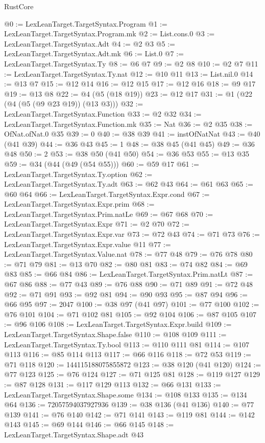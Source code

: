 \begin{lexlean}{RustCore}
\begin{coremodule}
@0 := LexLeanTarget.TargetSyntax.Program
@1 := LexLeanTarget.TargetSyntax.Program.mk
@2 := List.cons.{0}
@3 := LexLeanTarget.TargetSyntax.Adt
@4 := @2 @3
@5 := LexLeanTarget.TargetSyntax.Adt.mk
@6 := List.{0}
@7 := LexLeanTarget.TargetSyntax.Ty
@8 := @6 @7
@9 := @2 @8
@10 := @2 @7
@11 := LexLeanTarget.TargetSyntax.Ty.nat
@12 := @10 @11
@13 := List.nil.{0}
@14 := @13 @7
@15 := @12 @14
@16 := @12 @15
@17 := @12 @16
@18 := @9 @17
@19 := @13 @8
@22 := @4 (@5 (@18 @19))
@23 := @12 @17
@31 := @1 (@22 (@4 (@5 (@9 @23 @19)) (@13 @3)))
@32 := LexLeanTarget.TargetSyntax.Function
@33 := @2 @32
@34 := LexLeanTarget.TargetSyntax.Function.mk
@35 := Nat
@36 := @2 @35
@38 := OfNat.ofNat.{0} @35
@39 := 0
@40 := @38 @39
@41 := instOfNatNat
@43 := @40 (@41 @39)
@44 := @36 @43
@45 := 1
@48 := @38 @45 (@41 @45)
@49 := @36 @48
@50 := 2
@53 := @38 @50 (@41 @50)
@54 := @36 @53
@55 := @13 @35
@59 := @34 (@44 (@49 (@54 @55)))
@60 := @59 @17
@61 := LexLeanTarget.TargetSyntax.Ty.option
@62 := LexLeanTarget.TargetSyntax.Ty.adt
@63 := @62 @43
@64 := @61 @63
@65 := @60 @64
@66 := LexLeanTarget.TargetSyntax.Expr.cond
@67 := LexLeanTarget.TargetSyntax.Expr.prim
@68 := LexLeanTarget.TargetSyntax.Prim.natLe
@69 := @67 @68
@70 := LexLeanTarget.TargetSyntax.Expr
@71 := @2 @70
@72 := LexLeanTarget.TargetSyntax.Expr.var
@73 := @72 @43
@74 := @71 @73
@76 := LexLeanTarget.TargetSyntax.Expr.value @11
@77 := LexLeanTarget.TargetSyntax.Value.nat
@78 := @77 @48
@79 := @76 @78
@80 := @71 @79
@81 := @13 @70
@82 := @80 @81
@83 := @74 @82
@84 := @69 @83
@85 := @66 @84
@86 := LexLeanTarget.TargetSyntax.Prim.natLt
@87 := @67 @86
@88 := @77 @43
@89 := @76 @88
@90 := @71 @89
@91 := @72 @48
@92 := @71 @91
@93 := @92 @81
@94 := @90 @93
@95 := @87 @94
@96 := @66 @95
@97 := 2047
@100 := @38 @97 (@41 @97)
@101 := @77 @100
@102 := @76 @101
@104 := @71 @102 @81
@105 := @92 @104
@106 := @87 @105
@107 := @96 @106
@108 := LexLeanTarget.TargetSyntax.Expr.build
@109 := LexLeanTarget.TargetSyntax.Shape.false
@110 := @108 @109
@111 := LexLeanTarget.TargetSyntax.Ty.bool
@113 := @110 @111 @81
@114 := @107 @113
@116 := @85 @114 @113
@117 := @66 @116
@118 := @72 @53
@119 := @71 @118
@120 := 144115188075855872
@123 := @38 @120 (@41 @120)
@124 := @77 @123
@125 := @76 @124
@127 := @71 @125 @81
@128 := @119 @127
@129 := @87 @128
@131 := @117 @129 @113
@132 := @66 @131
@133 := LexLeanTarget.TargetSyntax.Shape.some
@134 := @108 @133
@135 := @134 @64
@136 := 72057594037927936
@139 := @38 @136 (@41 @136)
@140 := @77 @139
@141 := @76 @140
@142 := @71 @141
@143 := @119 @81
@144 := @142 @143
@145 := @69 @144
@146 := @66 @145
@148 := LexLeanTarget.TargetSyntax.Shape.adt @43

\end{coremodule}
\end{lexlean}
